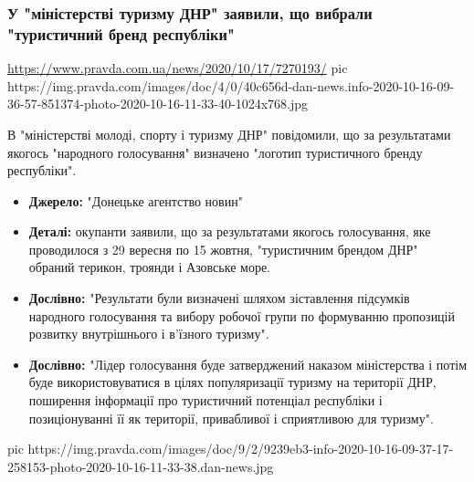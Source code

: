  
 

\subsubsection{У "міністерстві туризму ДНР" заявили, що вибрали "туристичний бренд республіки"}
\label{sec:16_10_2020.news.ua.pravda.1.dnr_turist_brand}

\url{https://www.pravda.com.ua/news/2020/10/17/7270193/}
\ifcmt
pic https://img.pravda.com/images/doc/4/0/40c656d-dan-news.info-2020-10-16-09-36-57-851374-photo-2020-10-16-11-33-40-1024x768.jpg
\fi

В "міністерстві молоді, спорту і туризму ДНР" повідомили, що за результатами якогось "народного голосування" визначено "логотип туристичного бренду республіки".

\begin{itemize}
\item \textbf{Джерело:} "Донецьке агентство новин"

\item \textbf{Деталі:} окупанти заявили, що за результатами якогось
        голосування, яке проводилося з 29 вересня по 15 жовтня, "туристичним
        брендом ДНР" обраний терикон, троянди і Азовське море.

\item \textbf{Дослівно:} "Результати були визначені шляхом зіставлення
        підсумків народного голосування та вибору робочої групи по формуванню
        пропозицій розвитку внутрішнього і в'їзного туризму".

\item \textbf{Дослівно:} "Лідер голосування буде затверджений наказом
        міністерства і потім буде використовуватися в цілях популяризації
        туризму на території ДНР, поширення інформації про туристичний
        потенціал республіки і позиціонуванні її як території, привабливої і
        сприятливою для туризму".
\end{itemize}

\ifcmt
pic https://img.pravda.com/images/doc/9/2/9239eb3-info-2020-10-16-09-37-17-258153-photo-2020-10-16-11-33-38.dan-news.jpg
\fi
